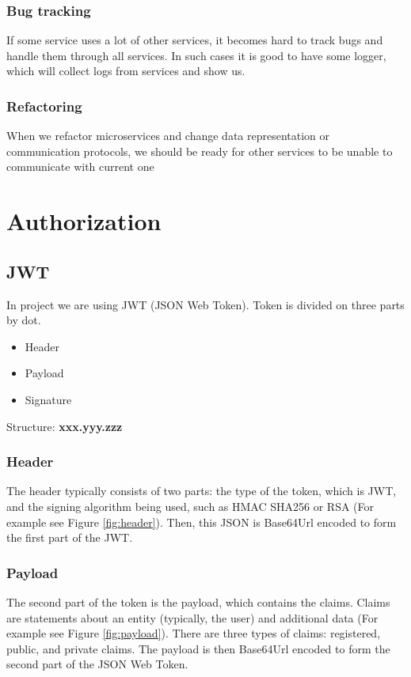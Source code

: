 		\subsubsection{Bug tracking}
		If some service uses a lot of other services, it becomes hard to track bugs and handle them through all services. In such cases it is good to have some logger, which will collect logs from services and show us.
		\subsubsection{Refactoring}
		When we refactor microservices and change data representation or communication protocols, we should be ready for other services to be unable to communicate with current one
\section{Authorization}
	\subsection{JWT}
	In project we are using JWT (JSON Web Token). Token is divided on three parts by dot.
	\begin{itemize}
		\item Header
		\item Payload
		\item Signature
	\end{itemize}
	
	Structure: \textbf{xxx.yyy.zzz}
	
	\subsubsection{Header}
	The header typically consists of two parts: the type of the token, which is JWT, and the signing algorithm being used, such as HMAC SHA256 or RSA (For example see Figure \ref{fig:header}). Then, this JSON is Base64Url encoded to form the first part of the JWT.
	
	
		
	
	
	
	\subsubsection{Payload}
	The second part of the token is the payload, which contains the claims. Claims are statements about an entity (typically, the user) and additional data (For example see Figure \ref{fig:payload}). There are three types of claims: registered, public, and private claims. The payload is then Base64Url encoded to form the second part of the JSON Web Token.
	
